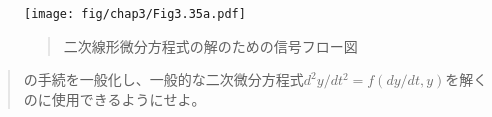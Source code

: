 \begin{figure}[tb]
\label{Figure 3.35}
\centering
\begin{comment}
\heading{Figure 3.35:} Signal-flow diagram for the solution to a second-order linear differential equation.

\begin{example}
               dy_0                y_0
                |                   |
                V                   V
   ddy     +----------+    dy  +----------+    y
+--------->| integral +-----*--+ integral +--*--->
|          +----------+     |  +----------+  |
|                           |                |
|            +----------+   |                |
|     __/|<--+ scale: a |<--+                |
|   _/   |   +----------+                    |
+--<_add |                                   |
     \__ |   +----------+                    |
        \|<--+ scale: b |<-------------------+
             +----------+
\end{example}
\end{comment}
\texttt{[image: fig/chap3/Fig3.35a.pdf]}
\begin{quote}
 二次線形微分方程式の解のための信号フロー図
\end{quote}
\end{figure}


\begin{quote}
の手続を一般化し、一般的な二次微分方程式\( d^2y / dt^2 =
f(dy / dt, y) \)を解くのに使用できるようにせよ。
\end{quote}

